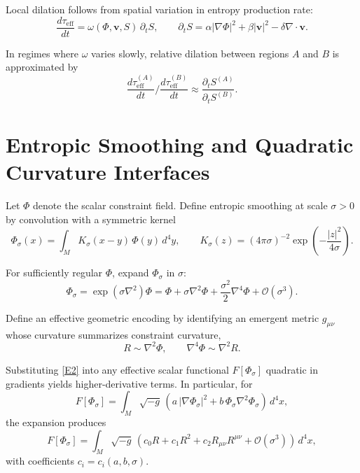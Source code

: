 \documentclass[11pt]{article}
\begin{document}
Local dilation follows from spatial variation in entropy production rate:
\begin{equation}
\frac{d\tau_{\mathrm{eff}}}{dt}
=
\omega(\Phi,\mathbf{v},S)\,\partial_t S,
\qquad
\partial_t S = \alpha|\nabla\Phi|^2 + \beta|\mathbf{v}|^2 - \delta\nabla\cdot\mathbf{v}.
\label{D8}
\end{equation}

In regimes where $\omega$ varies slowly, relative dilation between regions $A$ and $B$ is approximated by
\begin{equation}
\frac{d\tau_{\mathrm{eff}}^{(A)}}{dt}\Big/\frac{d\tau_{\mathrm{eff}}^{(B)}}{dt}
\approx
\frac{\partial_t S^{(A)}}{\partial_t S^{(B)}}.
\label{D9}
\end{equation}

\section{Entropic Smoothing and Quadratic Curvature Interfaces}

Let $\Phi$ denote the scalar constraint field. Define entropic smoothing at scale $\sigma>0$ by convolution with a symmetric kernel
\begin{equation}
\Phi_\sigma(x)
=
\int_M K_\sigma(x-y)\,\Phi(y)\,d^4y,
\qquad
K_\sigma(z)
=
(4\pi\sigma)^{-2}\exp\!\left(-\frac{|z|^2}{4\sigma}\right).
\label{E1}
\end{equation}

For sufficiently regular $\Phi$, expand $\Phi_\sigma$ in $\sigma$:
\begin{equation}
\Phi_\sigma
=
\exp(\sigma\nabla^2)\Phi
=
\Phi
+
\sigma\nabla^2\Phi
+
\frac{\sigma^2}{2}\nabla^4\Phi
+
\mathcal{O}(\sigma^3).
\label{E2}
\end{equation}

Define an effective geometric encoding by identifying an emergent metric $g_{\mu\nu}$ whose curvature summarizes constraint curvature,
\begin{equation}
R \sim \nabla^2\Phi,
\qquad
\nabla^4\Phi \sim \nabla^2 R.
\label{E3}
\end{equation}

Substituting \eqref{E2} into any effective scalar functional $F[\Phi_\sigma]$ quadratic in gradients yields higher-derivative terms. In particular, for
\begin{equation}
F[\Phi_\sigma]
=
\int_M \sqrt{-g}\, \left( a\,|\nabla\Phi_\sigma|^2 + b\,\Phi_\sigma\nabla^2\Phi_\sigma \right)\, d^4x,
\label{E4}
\end{equation}
the expansion produces
\begin{equation}
F[\Phi_\sigma]
=
\int_M \sqrt{-g}\,
\left(
c_0 R
+
c_1 R^2
+
c_2 R_{\mu\nu}R^{\mu\nu}
+
\mathcal{O}(\sigma^3)
\right)\, d^4x,
\label{E5}
\end{equation}
with coefficients $c_i=c_i(a,b,\sigma)$.
\end{document}

